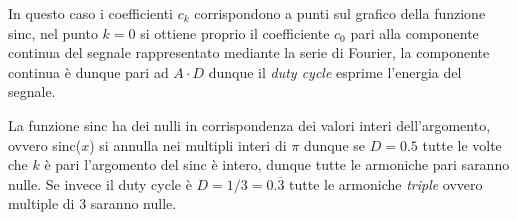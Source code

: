 In questo caso i coefficienti $c_k$ corrispondono a punti sul grafico della
funzione sinc, nel punto $k=0$ si ottiene proprio il coefficiente $c_0$ pari
alla componente continua del segnale rappresentato mediante la serie di
Fourier, la componente continua è dunque pari ad $A\cdot D$ dunque il
\textit{duty cycle} esprime l'energia del segnale.

La funzione sinc ha dei
nulli in corrispondenza dei valori interi dell'argomento, ovvero sinc($x$) si
annulla nei multipli interi di $\pi$ dunque se $D = 0.5$ tutte le volte che $k$
è pari l'argomento del sinc è intero, dunque tutte le armoniche pari saranno
nulle.
Se invece il duty cycle è $D=1/3 = 0.\overline{3}$ tutte le armoniche
\textit{triple} ovvero multiple di 3 saranno nulle.
